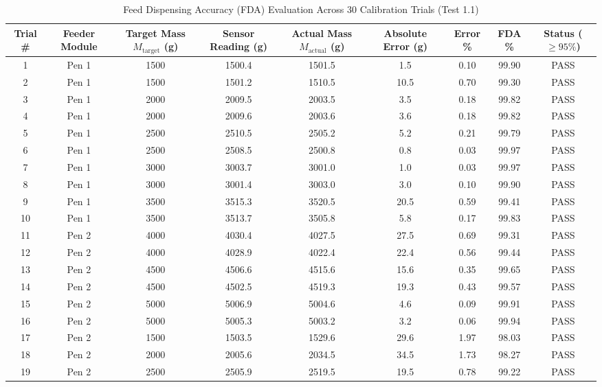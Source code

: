 \begin{table}[htbp!]
\centering
\caption{Feed Dispensing Accuracy (FDA) Evaluation Across 30 Calibration Trials (Test 1.1)}
\label{tab:fda_30_trials}
\begin{adjustbox}{width=\textwidth}
\begin{tabular}{ccccccccc}
\toprule
\textbf{Trial \#} & \textbf{Feeder Module} & \textbf{Target Mass $M_{\text{target}}$ (g)} & \textbf{Sensor Reading (g)} & \textbf{Actual Mass $M_{\text{actual}}$ (g)} & \textbf{Absolute Error (g)} & \textbf{Error \%} & \textbf{FDA \%} & \textbf{Status ($\ge 95\%$)} \\
\midrule
1 & Pen 1 & 1500 & 1500.4 & 1501.5 & 1.5 & 0.10 & 99.90 & PASS \\
2 & Pen 1 & 1500 & 1501.2 & 1510.5 & 10.5 & 0.70 & 99.30 & PASS \\
3 & Pen 1 & 2000 & 2009.5 & 2003.5 & 3.5 & 0.18 & 99.82 & PASS \\
4 & Pen 1 & 2000 & 2009.6 & 2003.6 & 3.6 & 0.18 & 99.82 & PASS \\
5 & Pen 1 & 2500 & 2510.5 & 2505.2 & 5.2 & 0.21 & 99.79 & PASS \\
6 & Pen 1 & 2500 & 2508.5 & 2500.8 & 0.8 & 0.03 & 99.97 & PASS \\
7 & Pen 1 & 3000 & 3003.7 & 3001.0 & 1.0 & 0.03 & 99.97 & PASS \\
8 & Pen 1 & 3000 & 3001.4 & 3003.0 & 3.0 & 0.10 & 99.90 & PASS \\
9 & Pen 1 & 3500 & 3515.3 & 3520.5 & 20.5 & 0.59 & 99.41 & PASS \\
10 & Pen 1 & 3500 & 3513.7 & 3505.8 & 5.8 & 0.17 & 99.83 & PASS \\
11 & Pen 2 & 4000 & 4030.4 & 4027.5 & 27.5 & 0.69 & 99.31 & PASS \\
12 & Pen 2 & 4000 & 4028.9 & 4022.4 & 22.4 & 0.56 & 99.44 & PASS \\
13 & Pen 2 & 4500 & 4506.6 & 4515.6 & 15.6 & 0.35 & 99.65 & PASS \\
14 & Pen 2 & 4500 & 4502.5 & 4519.3 & 19.3 & 0.43 & 99.57 & PASS \\
15 & Pen 2 & 5000 & 5006.9 & 5004.6 & 4.6 & 0.09 & 99.91 & PASS \\
16 & Pen 2 & 5000 & 5005.3 & 5003.2 & 3.2 & 0.06 & 99.94 & PASS \\
17 & Pen 2 & 1500 & 1503.5 & 1529.6 & 29.6 & 1.97 & 98.03 & PASS \\
18 & Pen 2 & 2000 & 2005.6 & 2034.5 & 34.5 & 1.73 & 98.27 & PASS \\
19 & Pen 2 & 2500 & 2505.9 & 2519.5 & 19.5 & 0.78 & 99.22 & PASS \\

\end{tabular}
\end{adjustbox}
\end{table}

